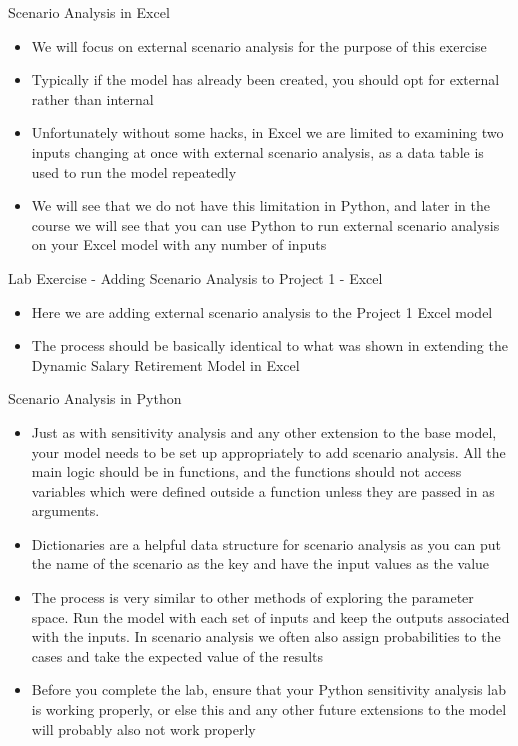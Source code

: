 \documentclass[]{article}
\begin{document}
\begin{section}{Scenario Analysis in Excel}
\begin{itemize}
\item We will focus on external scenario analysis for the purpose of this exercise
\item Typically if the model has already been created, you should opt for external rather than internal
\item Unfortunately without some hacks, in Excel we are limited to examining two inputs changing at once with external scenario analysis, as a data table is used to run the model repeatedly
\item We will see that we do not have this limitation in Python, and later in the course we will see that you can use Python to run external scenario analysis on your Excel model with any number of inputs
\end{itemize}
\end{section}
\begin{section}{Lab Exercise - Adding Scenario Analysis to Project 1 - Excel}
\begin{itemize}
\item Here we are adding external scenario analysis to the Project 1 Excel model
\item The process should be basically identical to what was shown in extending the Dynamic Salary Retirement Model in Excel
\end{itemize}
\end{section}
\begin{section}{Scenario Analysis in Python}
\begin{itemize}
\item Just as with sensitivity analysis and any other extension to the base model, your model needs to be set up appropriately to add scenario analysis. All the main logic should be in functions, and the functions should not access variables which were defined outside a function unless they are passed in as arguments.
\item Dictionaries are a helpful data structure for scenario analysis as you can put the name of the scenario as the key and have the input values as the value
\item The process is very similar to other methods of exploring the parameter space. Run the model with each set of inputs and keep the outputs associated with the inputs. In scenario analysis we often also assign probabilities to the cases and take the expected value of the results
\item Before you complete the lab, ensure that your Python sensitivity analysis lab is working properly, or else this and any other future extensions to the model will probably also not work properly
\end{itemize}
\end{section}
\end{document}
